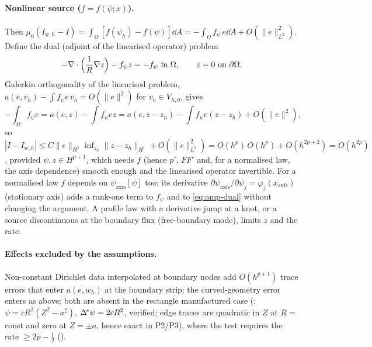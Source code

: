 \paragraph{Nonlinear source ($f=f(\psi;x)$).} Then
$\mu_0(I_{\mathrm w,h}-I)=\int_\Omega[f(\psi_h)-f(\psi)]\dd A
=-\int_\Omega f_\psi\,e\dd A+O(\|e\|_{L^2}^2)$. Define the dual (adjoint of the
linearised operator) problem
\begin{equation}
-\nabla\cdot\Bigl(\frac1R\nabla z\Bigr)-f_\psi z=-f_\psi\ \text{in }\Omega,\qquad z=0\ \text{on }\partial\Omega .
\label{eq:amp-dual}
\end{equation}
Galerkin orthogonality of the linearised problem,
$a(e,v_h)-\int f_\psi e\,v_h=O(\|e\|^2)$ for $v_h\in V_{h,0}$, gives
\begin{equation}
-\int_\Omega f_\psi e=a(e,z)-\int f_\psi e z=a(e,z-z_h)-\int f_\psi e(z-z_h)+O(\|e\|^2),
\end{equation}
so $|I-I_{\mathrm w,h}|\le C\|e\|_{H^1}\inf_{z_h}\|z-z_h\|_{H^1}+O(\|e\|_{L^2}^2)
=O(h^p)\,O(h^p)+O(h^{2p+2})=O(h^{2p})$, provided $\psi,z\in H^{p+1}$, which
needs $f$ (hence $p'$, $FF'$ and, for a normalised law, the axis dependence)
smooth enough and the linearised operator invertible. For a normalised law
$f$ depends on $\psi_{\mathrm{axis}}[\psi]$ too; its derivative
$\partial\psi_{\mathrm{axis}}/\partial\psi_j=\varphi_j(x_{\mathrm{axis}})$
(stationary axis) adds a rank-one term to $f_\psi$ and to
\eqref{eq:amp-dual} without changing the argument. A profile law with a
derivative jump at a knot, or a source discontinuous at the boundary flux
(free-boundary mode), limits $z$ and the rate.

\paragraph{Effects excluded by the assumptions.} Non-constant Dirichlet data
interpolated at boundary nodes add $O(h^{p+1})$ trace errors that enter
$a(e,w_h)$ at the boundary strip; the curved-geometry error enters as above;
both are absent in the rectangle manufactured case
(: $\psi=cR^2(Z^2-a^2)$,
$\Delta^{\!*}\psi=2cR^2$, verified; edge traces are quadratic in $Z$ at $R=$ const and
zero at $Z=\pm a$, hence exact in P2/P3), where the test requires the rate
$\ge2p-\tfrac12$ ().

